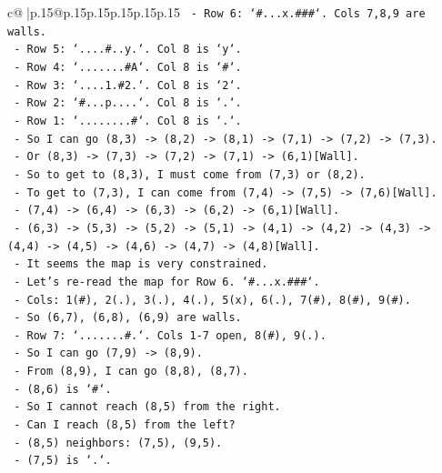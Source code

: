 \documentclass{article}
\begin{document}
{\begin{supertabular}{c@{$\;$}|p{.15\linewidth}@{}p{.15\linewidth}p{.15\linewidth}p{.15\linewidth}p{.15\linewidth}p{.15\linewidth}}
{{{\texttt{      {-} Row 6: `\#...x.\#\#\#`. Cols 7,8,9 are walls.} \\
\texttt{      {-} Row 5: `....\#..y.`. Col 8 is `y`.} \\
\texttt{      {-} Row 4: `.......\#A`. Col 8 is `\#`.} \\
\texttt{      {-} Row 3: `....1.\#2.`. Col 8 is `2`.} \\
\texttt{      {-} Row 2: `\#...p....`. Col 8 is `.`.} \\
\texttt{      {-} Row 1: `........\#`. Col 8 is `.`.} \\
\texttt{      {-} So I can go (8,3) {-}> (8,2) {-}> (8,1) {-}> (7,1) {-}> (7,2) {-}> (7,3).} \\
\texttt{      {-} Or (8,3) {-}> (7,3) {-}> (7,2) {-}> (7,1) {-}> (6,1){[}Wall{]}.} \\
\texttt{      {-} So to get to (8,3), I must come from (7,3) or (8,2).} \\
\texttt{      {-} To get to (7,3), I can come from (7,4) {-}> (7,5) {-}> (7,6){[}Wall{]}.} \\
\texttt{      {-} (7,4) {-}> (6,4) {-}> (6,3) {-}> (6,2) {-}> (6,1){[}Wall{]}.} \\
\texttt{      {-} (6,3) {-}> (5,3) {-}> (5,2) {-}> (5,1) {-}> (4,1) {-}> (4,2) {-}> (4,3) {-}> (4,4) {-}> (4,5) {-}> (4,6) {-}> (4,7) {-}> (4,8){[}Wall{]}.} \\
\texttt{      {-} It seems the map is very constrained.} \\
\texttt{      {-} Let's re{-}read the map for Row 6. `\#...x.\#\#\#`.} \\
\texttt{      {-} Cols: 1(\#), 2(.), 3(.), 4(.), 5(x), 6(.), 7(\#), 8(\#), 9(\#).} \\
\texttt{      {-} So (6,7), (6,8), (6,9) are walls.} \\
\texttt{      {-} Row 7: `.......\#.`. Cols 1{-}7 open, 8(\#), 9(.).} \\
\texttt{      {-} So I can go (7,9) {-}> (8,9).} \\
\texttt{      {-} From (8,9), I can go (8,8), (8,7).} \\
\texttt{      {-} (8,6) is `\#`.} \\
\texttt{      {-} So I cannot reach (8,5) from the right.} \\
\texttt{      {-} Can I reach (8,5) from the left?} \\
\texttt{      {-} (8,5) neighbors: (7,5), (9,5).} \\
\texttt{      {-} (7,5) is `.`.} \\
}}}
\end{supertabular}}
\end{document}
